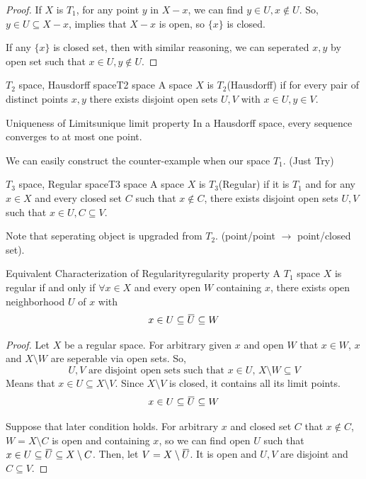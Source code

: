 \documentclass[12pt, a4paper, twoside]{article}
\newcommand{\overbar}[1]{\mkern 1.5mu\overline{\mkern-1.5mu#1\mkern-1.5mu}\mkern 1.5mu}
\theoremstyle{plain}
\begin{document}
\begin{proof}
    If $X$ is $T_1$, for any point $y$ in $X - x$, we can find $y \in U, x \notin U$. 
    So, $y \in U \subseteq X - x$, implies that $X - x$ is open, so $\{x\}$ is closed. 

    If any $\{x\}$ is closed set, then with similar reasoning, we can seperated $x, y$ by open set such that $x \in U, y \notin U$. 
\end{proof}

\begin{defn}{$T_2$ space, Hausdorff space}{T2 space}
    A space $X$ is $T_2$(Hausdorff) if for every pair of distinct points $x, y$ 
    there exists disjoint open sets $U, V$ with $x \in U, y \in V$. 
\end{defn}

\begin{prop}{Uniqueness of Limits}{unique limit property}
    In a Hausdorff space, every sequence converges to at most one point. 
\end{prop}

We can easily construct the counter-example when our space $T_1$. (Just Try)

\begin{defn}{$T_3$ space, Regular space}{T3 space}
    A space $X$ is $T_3$(Regular) if it is $T_1$ and for any $x \in X$ and every closed set $C$ such that $x \notin C$, there exists 
    disjoint open sets $U, V$ such that $x \in U, C \subseteq V$.  
\end{defn}
Note that seperating object is upgraded from $T_2$. (point/point $\rightarrow$ point/closed set). 

\begin{prop}{Equivalent Characterization of Regularity}{regularity property}
    A $T_1$ space $X$ is regular if and only if $\forall x \in X$ and every open $W$ containing $x$, there exists open neighborhood $U$ of $x$ with 
    \[x \in U \subseteq \overbar{U} \subseteq W\]
\end{prop}

\begin{proof}
    Let $X$ be a regular space. For arbitrary given $x$ and open $W$ that $x \in W$, 
    $x$ and $X \setminus W$ are seperable via open sets. So, 
    \[U,V \text{ are disjoint open sets such that } x \in U, \, X \setminus W \subseteq V\]
    Means that $x \in U \subseteq X \setminus V$. Since $X \setminus V$ is closed, it contains all its limit points.
    \[x \in U \subseteq \overbar{U} \subseteq W\]

    Suppose that later condition holds. For arbitrary $x$ and closed set $C$ that $x \notin C$, 
    $W = X \setminus C$ is open and containing $x$, so we can find open $U$ such that $x \in U \subseteq \overbar{U} \subseteq X \setminus C$. 
    Then, let $V = X \setminus \overbar{U}$. It is open and $U, V$ are disjoint and $C \subseteq V$. 
\end{proof} 
\end{document}
